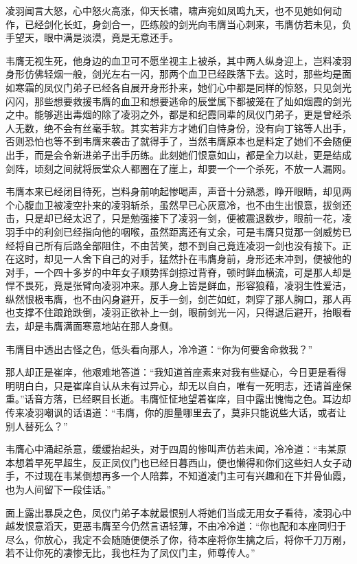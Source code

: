 凌羽闻言大怒，心中怒火高涨，仰天长啸，啸声宛如凤鸣九天，也不见她如何动作，已经剑化长虹，身剑合一，匹练般的剑光向韦膺当心刺来，韦膺仿若未见，负手望天，眼中满是淡漠，竟是无意还手。

韦膺无视生死，他身边的血卫可不愿坐视主上被杀，其中两人纵身迎上，岂料凌羽身形仿佛轻烟一般，剑光左右一闪，那两个血卫已经跌落下去。这时，那些均是面如寒霜的凤仪门弟子已经各自展开身形扑来，她们心中都是同样的惊怒，只见剑光闪闪，那些想要救援韦膺的血卫和想要逃命的辰堂属下都被笼在了灿如烟霞的剑光之中。能够逃出毒烟的除了凌羽之外，都是和纪霞同辈的凤仪门弟子，更是曾经杀人无数，绝不会有丝毫手软。其实若非方才她们自恃身份，没有向丁铭等人出手，否则恐怕也等不到韦膺来袭击了就得手了，当然韦膺原本也是料定了她们不会随便出手，而是会令新进弟子出手历练。此刻她们恨意如山，都是全力以赴，更是结成剑阵，顷刻之间就将辰堂众人都圈在了崖上，却要一个一个杀死，不放一人漏网。

韦膺本来已经闭目待死，岂料身前响起惨喝声，声音十分熟悉，睁开眼睛，却见两个心腹血卫被凌空扑来的凌羽斩杀，虽然早已心灰意冷，也不由生出恨意，拔剑还击，只是却已经太迟了，只是勉强接下了凌羽一剑，便被震退数步，眼前一花，凌羽手中的利剑已经指向他的咽喉，虽然距离还有丈余，可是韦膺只觉那一剑威势已经将自己所有后路全部阻住，不由苦笑，想不到自己竟连凌羽一剑也没有接下。正在这时，却见一人舍下自己的对手，猛然扑在韦膺身前，身形还未冲到，便被他的对手，一个四十多岁的中年女子顺势挥剑掠过背脊，顿时鲜血横流，可是那人却是悍不畏死，竟是张臂向凌羽冲来。那人身上皆是鲜血，形容狼藉，凌羽生性爱洁，纵然恨极韦膺，也不由闪身避开，反手一剑，剑芒如虹，刺穿了那人胸口，那人再也支撑不住踉跄跌倒，凌羽正欲补上一剑，眼前剑光一闪，只得退后避开，抬眼看去，却是韦膺满面寒意地站在那人身侧。

韦膺目中透出古怪之色，低头看向那人，冷冷道：“你为何要舍命救我？”

那人却正是崔庠，他艰难地答道：“我知道首座素来对我有些疑心，今日更是看得明明白白，只是崔庠自认从未有过异心，却无以自白，唯有一死明志，还请首座保重。”话音方落，已经瞑目长逝。韦膺怔怔地望着崔庠，目中露出愧悔之色。耳边却传来凌羽嘲讽的话语道：“韦膺，你的胆量哪里去了，莫非只能说些大话，或者让别人替死么？”

韦膺心中涌起杀意，缓缓抬起头，对于四周的惨叫声仿若未闻，冷冷道：“韦某原本想着早死早超生，反正凤仪门也已经日暮西山，便也懒得和你们这些妇人女子动手，不过现在韦某倒想再多一个人陪葬，不知道凌门主可有兴趣和在下并骨仙霞，也为人间留下一段佳话。”

面上露出暴戾之色，凤仪门弟子本就最恨别人将她们当成无用女子看待，凌羽心中越发恨意滔天，更恶韦膺至今仍然言语轻薄，不由冷冷道：“你也配和本座同归于尽么，你放心，我定不会随随便便杀了你，待本座将你生擒之后，将你千刀万剐，若不让你死的凄惨无比，我也枉为了凤仪门主，师尊传人。”

